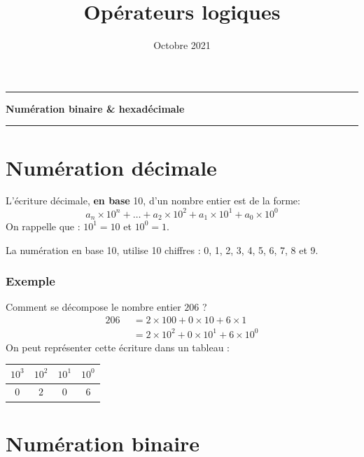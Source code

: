 \documentclass[11pt]{article}
\title{Opérateurs logiques}
\date{Octobre 2021}
\makeatletter
\renewcommand\maketitle[1]{
\hrule\medskip
{\raggedright %
\begin{center}
{\Huge \bfseries \sffamily #1 }\\[4ex] 
\hrule \bigskip
\end{center}}} %
\makeatother
\begin{document}
    
    \maketitle{Numération binaire \& hexadécimale}
    
    

    

    \hypertarget{numuxe9ration-duxe9cimale}{%
\section{Numération décimale}\label{numuxe9ration-duxe9cimale}}

L'écriture décimale, \textbf{en base} 10, d'un nombre entier est de la
forme:
\[a_{n} \times 10^{n}+ \ldots + a_{2} \times 10^{2} + a_{1} \times 10^{1} + a_{0} \times 10^{0}\]
On rappelle que : \(10^{1}=10\) et \(10^{0}=1\).

La numération en base 10, utilise 10 chiffres : 0, 1, 2, 3, 4, 5, 6, 7,
8 et 9.

    \hypertarget{exemple}{%
\subsubsection*{Exemple}\label{exemple}}

Comment se décompose le nombre entier \(206\) ? \begin{align*}
206 &= 2 \times 100 + 0 \times 10 + 6 \times 1\\
\phantom{1204} &= 2 \times 10^{2} + 0 \times 10^{1} + 6 \times 10^{0}
\end{align*} On peut représenter cette écriture dans un tableau :

\begin{longtable}[]{@{}cccc@{}}
\toprule
\(10^{3}\) & \(10^{2}\) & \(10^{1}\) & \(10^{0}\)\tabularnewline
\midrule
\endhead
\(0\) & \(2\) & \(0\) & \(6\)\tabularnewline
\bottomrule
\end{longtable}

    \hypertarget{numuxe9ration-binaire}{%
\section{Numération binaire}\label{numuxe9ration-binaire}}
\end{document}
